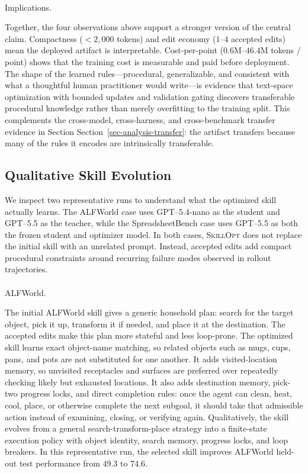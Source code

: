 \documentclass[
]{article}
\makeatletter
\let\oldparagraph\paragraph
\renewcommand{\paragraph}{
    \@ifstar
      \xxxParagraphStar
      \xxxParagraphNoStar
  }
\newcommand{\xxxParagraphStar}[1]{\oldparagraph*{#1}\mbox{}}
\newcommand{\xxxParagraphNoStar}[1]{\oldparagraph{#1}\mbox{}}
\newcommand{\ourmethod}{\textsc{SkillOpt}\xspace}
\makeatother
\begin{document}
\paragraph{Implications.}\label{implications.}

Together, the four observations above support a stronger version of the
central claim. Compactness (\(<2{,}000\) tokens) and edit economy
(\(1\)--\(4\) accepted edits) mean the deployed artifact is
interpretable. Cost-per-point (\(0.6\)M--\(46.4\)M tokens / point) shows
that the training cost is measurable and paid before deployment. The
shape of the learned rules---procedural, generalizable, and consistent
with what a thoughtful human practitioner would write---is evidence that
text-space optimization with bounded updates and validation gating
discovers transferable procedural knowledge rather than merely
overfitting to the training split. This complements the cross-model,
cross-harness, and cross-benchmark transfer evidence in Section
Section~\ref{sec-analysis-transfer}: the artifact transfers because many
of the rules it encodes are intrinsically transferable.

\subsection{Qualitative Skill
Evolution}\label{sec-qualitative-skill-evolution}

We inspect two representative runs to understand what the optimized
skill actually learns. The ALFWorld case uses GPT--5.4-nano as the
student and GPT--5.5 as the teacher, while the SpreadsheetBench case
uses GPT--5.5 as both the frozen student and optimizer model. In both
cases, \ourmethod{} does not replace the initial skill with an unrelated
prompt. Instead, accepted edits add compact procedural constraints
around recurring failure modes observed in rollout trajectories.

\paragraph{ALFWorld.}\label{alfworld.}

The initial ALFWorld skill gives a generic household plan: search for
the target object, pick it up, transform it if needed, and place it at
the destination. The accepted edits make this plan more stateful and
less loop-prone. The optimized skill learns exact object-name matching,
so related objects such as mugs, cups, pans, and pots are not
substituted for one another. It adds visited-location memory, so
unvisited receptacles and surfaces are preferred over repeatedly
checking likely but exhausted locations. It also adds destination
memory, pick-two progress locks, and direct completion rules: once the
agent can clean, heat, cool, place, or otherwise complete the next
subgoal, it should take that admissible action instead of examining,
closing, or verifying again. Qualitatively, the skill evolves from a
general search-transform-place strategy into a finite-state execution
policy with object identity, search memory, progress locks, and loop
breakers. In this representative run, the selected skill improves
ALFWorld held-out test performance from 49.3 to 74.6.
\end{document}

